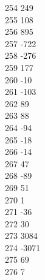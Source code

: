 { 254	249 \\
 255	108 \\
 256	895 \\
 257	-722 \\
 258	-276 \\
 259	177 \\
 260	-10 \\
 261	-103 \\
 262	89 \\
 263	88 \\
 264	-94 \\
 265	-18 \\
 266	-14 \\
 267	47 \\
 268	-89 \\
 269	51 \\
 270	1 \\
 271	-36 \\
 272	30 \\
 273	3084 \\
 274	-3071 \\
 275	69 \\
 276	7 \\
}
